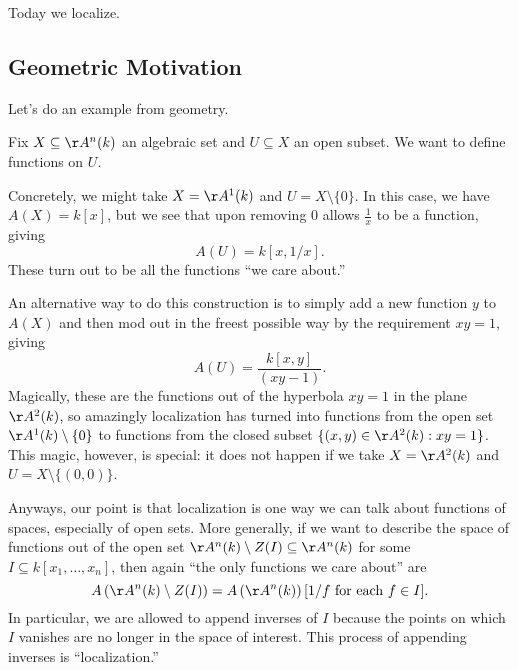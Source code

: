 
Today we localize.

\subsection{Geometric Motivation}
Let's do an example from geometry.

Fix $X\subseteq\AA^n(k)$ an algebraic set and $U\subseteq X$ an open subset. We want to define functions on $U$.
\begin{example}
	Concretely, we might take $X=\AA^1(k)$ and $U=X\setminus\{0\}$. In this case, we have $A(X)=k[x]$, but we see that upon removing $0$ allows $\frac1x$ to be a function, giving
	\[A(U)=k[x,1/x].\]
	These turn out to be all the functions ``we care about.''
\end{example}
An alternative way to do this construction is to simply add a new function $y$ to $A(X)$ and then mod out in the freest possible way by the requirement $xy=1$, giving
\[A(U)=\frac{k[x,y]}{(xy-1)}.\]
Magically, these are the functions out of the hyperbola $xy=1$ in the plane $\AA^2(k)$, so amazingly localization has turned into functions from the open set $\AA^1(k)\setminus\{0\}$ to functions from the closed subset $\{(x,y)\in\AA^2(k):xy=1\}$. This magic, however, is special: it does not happen if we take $X=\AA^2(k)$ and $U=X\setminus\{(0,0)\}$.

Anyways, our point is that localization is one way we can talk about functions of spaces, especially of open sets. More generally, if we want to describe the space of functions out of the open set $\AA^n(k)\setminus Z(I)\subseteq\AA^n(k)$ for some $I\subseteq k[x_1,\ldots,x_n]$, then again ``the only functions we care about'' are
\[A\left(\AA^n(k)\setminus Z(I)\right)=A\left(\AA^n(k)\right)[1/f\text{ for each }f\in I].\]
In particular, we are allowed to append inverses of $I$ because the points on which $I$ vanishes are no longer in the space of interest. This process of appending inverses is ``localization.''

